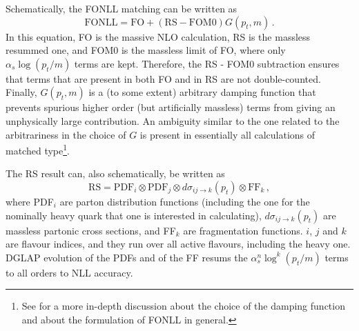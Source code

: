 \documentclass{PoS}
\def\be{\begin{equation}}
\def\ee{\end{equation}}
\begin{document}
Schematically, the FONLL matching can be written as
\be
\mathrm{FONLL} = \mathrm{FO} + (\mathrm{RS} - \mathrm{FOM0}) G(p_t,m) \, .
\ee
In this equation, FO is the massive NLO calculation, RS is the massless resummed one, and
FOM0 is the massless limit of FO, where only $\alpha_s \log(p_t/m)$ terms are
kept. Therefore, the RS - FOM0 subtraction ensures that terms
that are present in both FO and in RS are not double-counted. Finally, 
$G(p_t,m)$ is a (to some extent) arbitrary damping function that prevents
spurious higher order (but artificially massless) terms from giving an 
unphysically large contribution. An ambiguity similar to the one related to the arbitrariness in the choice of
$G$ is present in essentially all calculations of matched type\footnote{See 
\cite{Cacciari:1998it} for a more in-depth discussion about the choice of the damping
function and about the formulation of FONLL in general.}.
 

The RS result can, also schematically, be written as
\be
\label{eq:rs}
\mathrm{RS} = \mathrm{PDF}_i \otimes \mathrm{PDF}_j \otimes d\sigma_{ij \to k}(p_t)
\otimes \mathrm{FF}_k \, ,
\ee
where PDF$_i$ are parton distribution functions (including the one for the
nominally heavy quark that one is interested in calculating), $d\sigma_{ij \to
k}(p_t)$ are massless partonic cross sections, and FF$_k$ are 
fragmentation functions. $i$, $j$ and $k$ are flavour indices, and they run over
all active flavours, including the heavy one. DGLAP evolution of the PDFs and 
of the FF resums the  $\alpha_s^n\log^k(p_t/m)$ terms to all orders to NLL accuracy.
\end{document}
